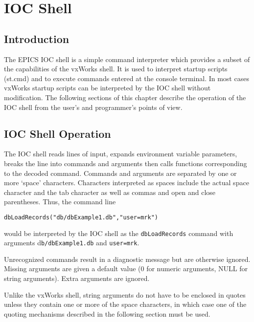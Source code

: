 





\chapter{IOC Shell}

\section{Introduction}

The EPICS IOC shell is a simple command interpreter which provides a subset of the capabilities of the vxWorks shell. It 
is used to interpret startup scripts (st.cmd) and to execute commands entered at the console terminal.  In most cases 
vxWorks startup scripts can be interpreted by the IOC shell without modification. The following sections of this chapter 
describe the operation of the IOC shell from the user's and programmer's points of view.

\section{IOC Shell Operation}

The IOC shell reads lines of input, expands environment variable parameters, breaks the line into commands and 
arguments then calls functions corresponding to the decoded command. Commands and arguments are separated by one 
or more `space' characters. Characters interpreted as spaces include the actual space character and the tab character as 
well as commas and open and close parentheses. Thus, the command line

\begin{verbatim}dbLoadRecords("db/dbExample1.db","user=mrk")
\end{verbatim}would be interpreted by the IOC shell as the \verb|dbLoadRecords| command with arguments d\verb|b/dbExample1.db| and 
\verb|user=mrk|.

Unrecognized commands result in a diagnostic message but are otherwise ignored.  Missing arguments are given a default 
value (0 for numeric arguments, NULL for string arguments).  Extra arguments are ignored.

Unlike the vxWorks shell, string arguments do not have to be enclosed in quotes unless they contain one or more of the 
space characters, in which case one of the quoting mechanisms described in the following section must be used.

